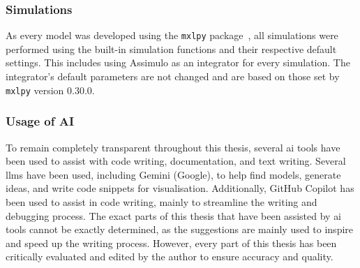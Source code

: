 \subsubsection{Simulations}

As every model was developed using the \verb|mxlpy| package~\cite{vanaalstMxlPyPythonPackage2025}, all simulations were performed using the built-in simulation functions and their respective default settings. This includes using Assimulo as an integrator for every simulation. The integrator's default parameters are not changed and are based on those set by \verb|mxlpy| version 0.30.0.

\subsubsection{Usage of AI}
To remain completely transparent throughout this thesis, several \gls{ai} tools have been used to assist with code writing, documentation, and text writing. Several \glspl{llm} have been used, including Gemini (Google), to help find models, generate ideas, and write code snippets for visualisation. Additionally, GitHub Copilot has been used to assist in code writing, mainly to streamline the writing and debugging process. The exact parts of this thesis that have been assisted by \gls{ai} tools cannot be exactly determined, as the suggestions are mainly used to inspire and speed up the writing process. However, every part of this thesis has been critically evaluated and edited by the author to ensure accuracy and quality.